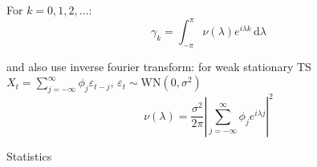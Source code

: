 \begin{itemize}[topsep=2pt,itemsep=0pt]
\begin{itemize}[topsep=2pt,itemsep=0pt]
            For $ k=0,1,2,\ldots $:
            \begin{equation}
                \gamma _k=\int _{-\pi}^\pi \nu (\lambda )e^{i\lambda k} \,\mathrm{d}\lambda  
            \end{equation}
            
            and also use inverse fourier transform: for weak stationary TS $ X_t=\sum_{j=-\infty}^\infty \phi _j\varepsilon _{t-j} $, $ \varepsilon _t\sim \mathrm{WN}(0,\sigma ^2)  $
            \begin{equation}
                \nu (\lambda )= \dfrac{\sigma ^2}{2\pi}\left\vert \sum_{j=-\infty}^\infty \phi _je^{i\lambda j} \right\vert ^2
            \end{equation}
            
            
            
        \end{itemize}
        
            

        
        
        
    \end{itemize}

\begin{point}
    Statistics
\end{point}

